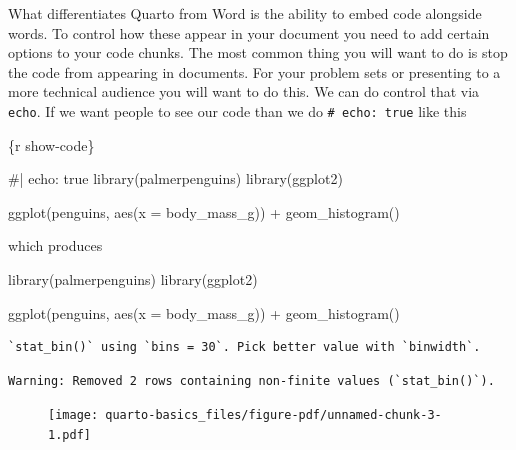 \documentclass[
  letterpaper,
  DIV=11,
  numbers=noendperiod,
  oneside]{scrreprt}
\newenvironment{Shaded}{\begin{snugshade}}{\end{snugshade}}
\newcommand{\AttributeTok}[1]{\textcolor[rgb]{0.40,0.45,0.13}{#1}}
\newcommand{\CommentTok}[1]{\textcolor[rgb]{0.37,0.37,0.37}{#1}}
\newcommand{\FunctionTok}[1]{\textcolor[rgb]{0.28,0.35,0.67}{#1}}
\newcommand{\InformationTok}[1]{\textcolor[rgb]{0.37,0.37,0.37}{#1}}
\newcommand{\NormalTok}[1]{\textcolor[rgb]{0.00,0.23,0.31}{#1}}
\newcommand{\SpecialCharTok}[1]{\textcolor[rgb]{0.37,0.37,0.37}{#1}}
\begin{document}
What differentiates Quarto from Word is the ability to embed code
alongside words. To control how these appear in your document you need
to add certain options to your code chunks. The most common thing you
will want to do is stop the code from appearing in documents. For your
problem sets or presenting to a more technical audience you will want to
do this. We can do control that via \texttt{echo}. If we want people to
see our code than we do \texttt{\#\textbar{}\ echo:\ true} like this

\begin{Shaded}
\begin{Highlighting}[]
\InformationTok{\textasciigrave{}\textasciigrave{}\textasciigrave{}\{r show{-}code\}}

\CommentTok{\#| echo: true }
\FunctionTok{library}\NormalTok{(palmerpenguins)}
\FunctionTok{library}\NormalTok{(ggplot2)}

\FunctionTok{ggplot}\NormalTok{(penguins, }\FunctionTok{aes}\NormalTok{(}\AttributeTok{x =}\NormalTok{ body\_mass\_g)) }\SpecialCharTok{+}
\FunctionTok{geom\_histogram}\NormalTok{()}
\InformationTok{\textasciigrave{}\textasciigrave{}\textasciigrave{}}
\end{Highlighting}
\end{Shaded}

which produces

\begin{Shaded}
\begin{Highlighting}[]
\FunctionTok{library}\NormalTok{(palmerpenguins)}
\FunctionTok{library}\NormalTok{(ggplot2)}

\FunctionTok{ggplot}\NormalTok{(penguins, }\FunctionTok{aes}\NormalTok{(}\AttributeTok{x =}\NormalTok{ body\_mass\_g)) }\SpecialCharTok{+}
\FunctionTok{geom\_histogram}\NormalTok{()}
\end{Highlighting}
\end{Shaded}

\begin{verbatim}
`stat_bin()` using `bins = 30`. Pick better value with `binwidth`.
\end{verbatim}

\begin{verbatim}
Warning: Removed 2 rows containing non-finite values (`stat_bin()`).
\end{verbatim}

\begin{figure}[H]

{\centering \texttt{[image: quarto-basics\_files/figure-pdf/unnamed-chunk-3-1.pdf]}

}

\end{figure}
\end{document}
